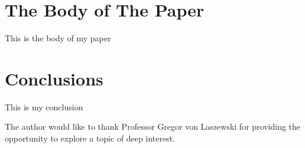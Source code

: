 \documentclass[sigconf]{acmart}
\begin{document}
\section{The Body of The Paper}
This is the body of my paper

\section{Conclusions}
This is my conclusion

\begin{acks}
The author would like to thank Professor Gregor von Laszewski for providing the opportunity to explore a topic of deep interest.

\end{acks}



 
\end{document}
